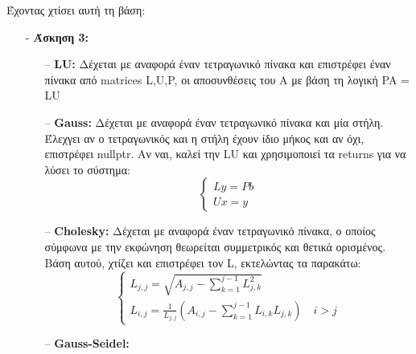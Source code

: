 \documentclass{article}
\newcommand{\lt}{\latintext}
\newcommand{\gt}{\greektext}
\begin{document}
\begin{itemize}
            \gt Έχοντας χτίσει αυτή τη βάση:
            \begin{itemize}
                \item [-] \textbf{\gt Άσκηση 3:}
                \begin{itemize}
                    \item [--] \textbf{\lt LU:}
                            \gt Δέχεται με αναφορά έναν τετραγωνικό πίνακα
                            \gt και επιστρέφει έναν πίνακα από \lt matrices L,U,P,
                            \gt οι αποσυνθέσεις του Α με βάση τη λογική \lt PA = LU
                    \item [--] \textbf{\lt Gauss:}
                            \gt Δέχεται με αναφορά έναν τετραγωνικό πίνακα και μία στήλη.
                            \gt Έλεχγει αν ο τετραγωνικός και η στήλη έχουν ίδιο μήκος και αν όχι,
                            \gt επιστρέφει \lt nullptr.
                            \gt Αν ναι, καλεί την \lt LU \gt και χρησιμοποιεί τα \lt returns
                            \gt για να λύσει το σύστημα:
                            \begin{equation*}
                                \begin{cases}
                                    Ly = Pb\\
                                    Ux = y
                                \end{cases}
                            \end{equation*} 
                    \item [--] \textbf{\lt Cholesky:}
                            \gt Δέχεται με αναφορά έναν τετραγωνικό πίνακα,
                            \gt ο οποίος σύμφωνα με την εκφώνηση θεωρείται συμμετρικός
                            \gt και θετικά ορισμένος. Βάση αυτού, χτίζει και επιστρέφει
                            \gt τον \lt L, \gt εκτελώντας τα παρακάτω:
                            \begin{equation*}
                                \begin{cases}
                                    L_{j,j} = \sqrt{A_{j,j} - \sum_{k=1}^{j-1}L_{j,k}^{2}}\\
                                    L_{i,j} = \frac{1}{L_{j,j}}(A_{i,j} - \sum_{k=1}^{j-1}L_{i,k}L_{j,k}) \quad i>j
                                \end{cases}
                            \end{equation*}
                    \item [--] \textbf{\lt Gauss-Seidel:}

\end{itemize}
\end{itemize}
\end{itemize}
\end{document}
